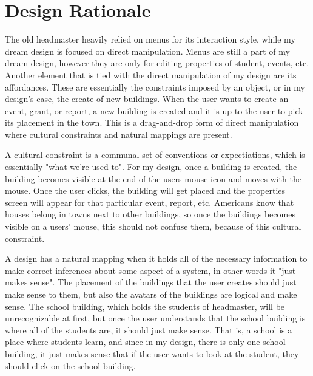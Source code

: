 \documentclass[11pt]{article}
\begin{document}
\section{Design Rationale}
The old headmaster heavily relied on menus for its interaction style, while my dream design is focused on direct manipulation. Menus are still a part of my dream design, however they are only for editing properties of student, events, etc. Another element that is tied with the direct manipulation of my design are its affordances. These are essentially the constraints imposed by an object, or in my design's case, the create of new buildings. When the user wants to create an event, grant, or report, a new building is created and it is up to the user to pick its placement in the town. This is a drag-and-drop form of direct manipulation where cultural constraints and natural mappings are present. 

A cultural constraint is a communal set of conventions or expectiations, which is essentially "what we're used to". For my design, once a building is created, the building becomes visible at the end of the users mouse icon and moves with the mouse. Once the user clicks, the building will get placed and the properties screen will appear for that particular event, report, etc. Americans know that houses belong in towns next to other buildings, so once the buildings becomes visible on a users' mouse, this should not confuse them, because of this cultural constraint. 

A design has a natural mapping when it holds all of the necessary information to make correct inferences about some aspect of a system, in other words it "just makes sense". The placement of the buildings that the user creates should just make sense to them, but also the avatars of the buildings are logical and make sense. The school building, which holds the students of headmaster, will be unrecognizable at first, but once the user understands that the school building is where all of the students are, it should just make sense. That is, a school is a place where students learn, and since in my design, there is only one school building, it just makes sense that if the user wants to look at the student, they should click on the school building. 
\end{document}
